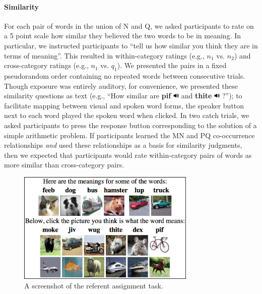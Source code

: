 \documentclass[man,floatsintext]{apa6}
\begin{document}
\paragraph{Similarity}
For each pair of words in the union of N and Q, we asked participants to rate on a 5 point scale how similar they believed the two words to be in meaning. In particular, we instructed participants to  ``tell us how similar you think they are in terms of meaning''. This resulted in within-category ratings (e.g., $n_1$ vs. $n_2$) and cross-category ratings (e.g., $n_1$ vs. $q_1$). We presented the pairs in a fixed pseudorandom order containing no repeated words between consecutive trials. Though exposure was entirely auditory, for convenience, we presented these similarity questions as text (e.g., ``How similar are \textbf{pif} \includegraphics[width=0.3cm]{play.png} and \textbf{thite} \includegraphics[width=0.3cm]{play.png} ?''); to facilitate mapping between visual and spoken word forms, the speaker button next to each word played the spoken word when clicked. In two catch trials, we asked participants to press the response button corresponding to the solution of a simple arithmetic problem. If participants learned the MN and PQ co-occurrence relationships \emph{and} used these relationships as a basis for similarity judgments, then we expected that participants would rate within-category pairs of words as more similar than cross-category pairs.

\begin{figure}[t]
  \begin{center}
    \includegraphics[width=8.5cm]{meaning-html-cropped.png}
    \caption{A screenshot of the referent assignment task.}
    \label{meaning-task}
  \end{center}
\end{figure}
\end{document}
